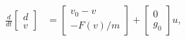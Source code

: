 \documentclass[preview]{standalone}
\begin{document}
\begin{align*}
\frac{d}{dt}\begin{bmatrix}d\\ v\end{bmatrix} &= \begin{bmatrix}v_0 - v\\ -F(v)/m\end{bmatrix} + \begin{bmatrix}0\\g_0\end{bmatrix}u, \\
\end{align*}
\end{document}
